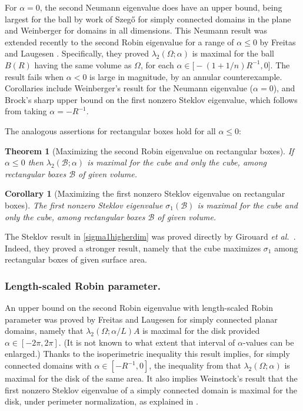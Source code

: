 \documentclass[12pt,reqno]{amsart}
\newtheorem{theorem}{Theorem}[section]
\newtheorem{corollary}[corollary]{Corollary}
\theoremstyle{definition}
\begin{document}
For $\alpha=0$, the second Neumann eigenvalue does have an upper bound, being largest for the ball by work of Szeg\H{o} \cite{S54} for simply connected domains in the plane and Weinberger \cite{W56} for domains in all dimensions. This Neumann result was extended recently to the second Robin eigenvalue for a range of $\alpha \leq 0$ by Freitas and Laugesen \cite{FL18a}. Specifically, they proved $\lambda_2(\Omega;\alpha)$ is maximal for the ball $B(R)$ having the same volume as $\Omega$, for each $\alpha \in \big[-(1+1/n)R^{-1},0 \big]$. The result fails when $\alpha<0$ is large in magnitude, by an annular counterexample. Corollaries include Weinberger's result for the Neumann eigenvalue ($\alpha=0$), and Brock's sharp upper bound \cite{B01} on the first nonzero Steklov eigenvalue, which follows from taking $\alpha=-R^{-1}$. 

The analogous assertions for rectangular boxes hold for all $\alpha \leq 0$:
%
\begin{theorem}[Maximizing the second Robin eigenvalue on rectangular boxes]\label{lambda2higherdim}
If $\alpha \leq 0$ then $\lambda_2(\mathcal{B};\alpha)$ is maximal for the cube and only the cube, among rectangular boxes $\mathcal{B}$ of given volume. 
\end{theorem}
%
\begin{corollary}[Maximizing the first nonzero Steklov eigenvalue on rectangular boxes]\label{sigma1higherdim}
The first nonzero Steklov eigenvalue $\sigma_1(\mathcal{B})$ is maximal for the cube and only the cube, among rectangular boxes $\mathcal{B}$ of given volume. 
\end{corollary}
%
The Steklov result in \autoref{sigma1higherdim} was proved directly by Girouard \emph{et al.}\ \cite[Theorem 1.6]{GLPS17}. Indeed, they proved a stronger result, namely that the cube maximizes $\sigma_1$ among rectangular boxes of given surface area.  

\subsubsection*{Length-scaled Robin parameter.}
An upper bound on the second Robin eigenvalue with length-scaled Robin parameter was proved by Freitas and Laugesen \cite[Theorem B]{FL18b} for simply connected planar domains, namely that $\lambda_2(\Omega;\alpha/L) A$ is maximal for the disk provided $\alpha \in [-2\pi,2\pi]$. (It is not known to what extent that interval of $\alpha$-values can be enlarged.) Thanks to the isoperimetric inequality this result implies, for simply connected domains with $\alpha \in [-R^{-1},0]$, the inequality from \cite{FL18a} that $\lambda_2(\Omega;\alpha)$ is maximal for the disk of the same area. It also implies Weinstock's result \cite{We54} that the first nonzero Steklov eigenvalue of a simply connected domain is maximal for the disk, under perimeter normalization, as explained in \cite{FL18b}. 
\end{document}

